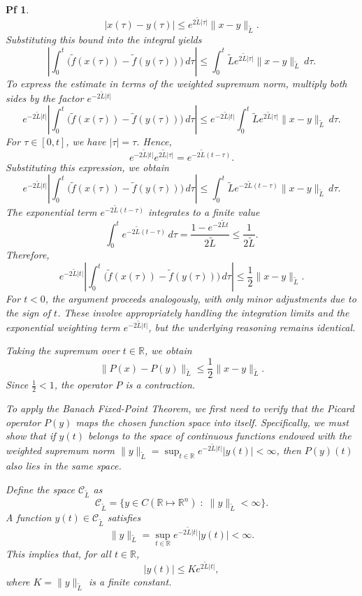 \documentclass[10pt,a4paper]{amsart}
\newtheorem{pf}{Pf}
\begin{document}
\begin{pf}
\[
|x(\tau) - y(\tau)| \leq e^{2\tilde L |\tau|} \|x - y\|_{\tilde L}.
\]  
Substituting this bound into the integral yields
\[
\left| \int_0^t \big(\tilde f(x(\tau)) - \tilde f(y(\tau))\big) \, d\tau \right| \leq \int_0^t \tilde L e^{2\tilde L |\tau|} \|x - y\|_{\tilde L} \, d\tau.
\]
To express the estimate in terms of the weighted supremum norm, multiply both sides by the factor \( e^{-2\tilde L |t|} \) 
\[
e^{-2\tilde L |t|} \left| \int_0^t \big(\tilde f(x(\tau)) - \tilde f(y(\tau))\big) \, d\tau \right| 
\leq e^{-2\tilde L |t|} \int_0^t \tilde L e^{2\tilde L |\tau|} \|x - y\|_{\tilde L} \, d\tau.
\]
For \( \tau \in [0, t] \), we have \( |\tau| = \tau \). Hence,  
\[
e^{-2\tilde L |t|} e^{2\tilde L |\tau|} = e^{-2\tilde L (t - \tau)}.
\]
Substituting this expression, we obtain 
\[
e^{-2\tilde L |t|} \left| \int_0^t \big(\tilde f(x(\tau)) - \tilde f(y(\tau))\big) \, d\tau \right| 
\leq \int_0^t \tilde L e^{-2\tilde L (t - \tau)} \|x - y\|_{\tilde L} \, d\tau.
\]
The exponential term \( e^{-2\tilde L (t - \tau)} \) integrates to a finite value 
\[
\int_0^t e^{-2\tilde L (t - \tau)} \, d\tau = \frac{1 - e^{-2\tilde L t}}{2\tilde L} \leq \frac{1}{2\tilde L}.
\]
Therefore,
\[
e^{-2\tilde L |t|} \left| \int_0^t \big(\tilde f(x(\tau)) - \tilde f(y(\tau))\big) \, d\tau \right| 
\leq  \frac{1}{2} \|x - y\|_{\tilde L}.
\]
For \( t < 0 \), the argument proceeds analogously, with only minor adjustments due to the sign of \( t \). These involve appropriately handling the integration limits and the exponential weighting term \( e^{-2\tilde L |t|} \), but the underlying reasoning remains identical.

Taking the supremum over \( t \in \mathbb{R} \), we obtain
\[
\|P(x)- P(y)\|_{\tilde L} \leq \frac{1}{2} \|x - y\|_{\tilde L}.
\]
Since \( \frac{1}{2} < 1 \), the operator \( P \) is a contraction. 

To apply the Banach Fixed-Point Theorem, we first need to verify that the Picard operator \( P(y) \) maps the chosen function space into itself. Specifically, we must show that if \( y(t) \) belongs to the space of continuous functions endowed with the weighted supremum norm \( \|y\|_{\tilde L} = \sup_{t \in \mathbb{R}} e^{-2\tilde L |t|} |y(t)| < \infty \), then \( P(y)(t) \) also lies in the same space.

Define the space \( \mathcal{C}_{\tilde L} \) as
   \[
   \mathcal{C}_{\tilde L} = \{ y \in C(\mathbb{R} \mapsto \mathbb{R}^n) \; : \; \|y\|_{\tilde L} < \infty \}.
   \]
A function \( y(t) \in \mathcal{C}_{\tilde{L}} \) satisfies
\[
\|y\|_{\tilde{L}} = \sup_{t \in \mathbb{R}} e^{-2\tilde{L} |t|} |y(t)| < \infty.
\]
This implies that, for all \( t \in \mathbb{R} \),
\[
|y(t)| \leq K e^{2\tilde{L}|t|},
\]
where \( K = \|y\|_{\tilde{L}} \) is a finite constant.


\end{pf}
\end{document}
